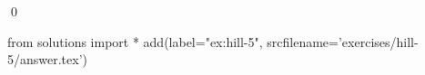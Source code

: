 
\begin{ex} 
  \label{ex:hill-5}
  
  \qed
\end{ex} 
\begin{python0}
from solutions import *
add(label="ex:hill-5",
    srcfilename='exercises/hill-5/answer.tex') 
\end{python0}
